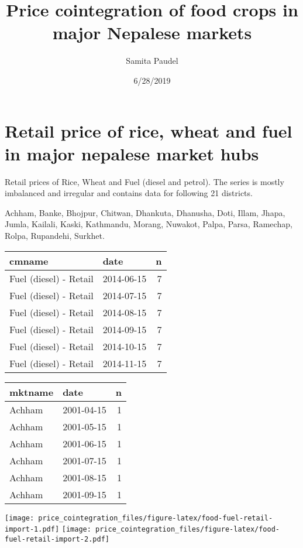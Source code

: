 \documentclass[12pt,]{article}
\title{Price cointegration of food crops in major Nepalese markets}
\author{Samita Paudel}
\date{6/28/2019}
\begin{document}
\maketitle

\hypertarget{retail-price-of-rice-wheat-and-fuel-in-major-nepalese-market-hubs}{%
\section{Retail price of rice, wheat and fuel in major nepalese market hubs}\label{retail-price-of-rice-wheat-and-fuel-in-major-nepalese-market-hubs}}

Retail prices of Rice, Wheat and Fuel (diesel and petrol). The series is mostly imbalanced and irregular and contains data for following 21 districts.

Achham, Banke, Bhojpur, Chitwan, Dhankuta, Dhanusha, Doti, Illam, Jhapa, Jumla, Kailali, Kaski, Kathmandu, Morang, Nuwakot, Palpa, Parsa, Ramechap, Rolpa, Rupandehi, Surkhet.

\begin{tabular}{llr}
\toprule
cmname & date & n\\
\midrule
Fuel (diesel) - Retail & 2014-06-15 & 7\\
Fuel (diesel) - Retail & 2014-07-15 & 7\\
Fuel (diesel) - Retail & 2014-08-15 & 7\\
Fuel (diesel) - Retail & 2014-09-15 & 7\\
Fuel (diesel) - Retail & 2014-10-15 & 7\\
\addlinespace
Fuel (diesel) - Retail & 2014-11-15 & 7\\
\bottomrule
\end{tabular}

\begin{tabular}{llr}
\toprule
mktname & date & n\\
\midrule
Achham & 2001-04-15 & 1\\
Achham & 2001-05-15 & 1\\
Achham & 2001-06-15 & 1\\
Achham & 2001-07-15 & 1\\
Achham & 2001-08-15 & 1\\
\addlinespace
Achham & 2001-09-15 & 1\\
\bottomrule
\end{tabular}

\texttt{[image: price\_cointegration\_files/figure-latex/food-fuel-retail-import-1.pdf]} \texttt{[image: price\_cointegration\_files/figure-latex/food-fuel-retail-import-2.pdf]}
\end{document}
